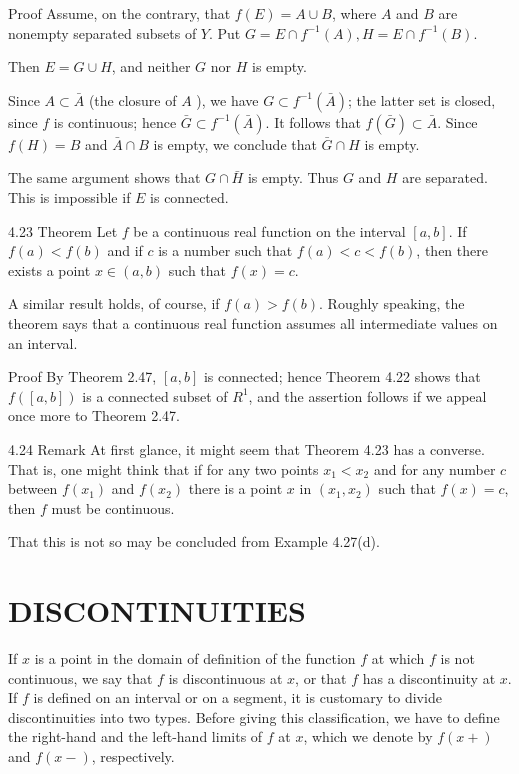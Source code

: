\documentclass[10pt]{article}
\begin{document}
Proof Assume, on the contrary, that $f(E)=A \cup B$, where $A$ and $B$ are nonempty separated subsets of $Y$. Put $G=E \cap f^{-1}(A), H=E \cap f^{-1}(B)$.

Then $E=G \cup H$, and neither $G$ nor $H$ is empty.

Since $A \subset \bar{A}$ (the closure of $A$ ), we have $G \subset f^{-1}(\bar{A})$; the latter set is closed, since $f$ is continuous; hence $\bar{G} \subset f^{-1}(\bar{A})$. It follows that $f(\bar{G}) \subset \bar{A}$. Since $f(H)=B$ and $\bar{A} \cap B$ is empty, we conclude that $\bar{G} \cap H$ is empty.

The same argument shows that $G \cap \bar{H}$ is empty. Thus $G$ and $H$ are separated. This is impossible if $E$ is connected.

4.23 Theorem Let $f$ be a continuous real function on the interval $[a, b]$. If $f(a)<f(b)$ and if $c$ is a number such that $f(a)<c<f(b)$, then there exists a point $x \in(a, b)$ such that $f(x)=c$.

A similar result holds, of course, if $f(a)>f(b)$. Roughly speaking, the theorem says that a continuous real function assumes all intermediate values on an interval.

Proof By Theorem 2.47, $[a, b]$ is connected; hence Theorem 4.22 shows that $f([a, b])$ is a connected subset of $R^{1}$, and the assertion follows if we appeal once more to Theorem 2.47.

4.24 Remark At first glance, it might seem that Theorem 4.23 has a converse. That is, one might think that if for any two points $x_{1}<x_{2}$ and for any number $c$ between $f\left(x_{1}\right)$ and $f\left(x_{2}\right)$ there is a point $x$ in $\left(x_{1}, x_{2}\right)$ such that $f(x)=c$, then $f$ must be continuous.

That this is not so may be concluded from Example 4.27(d).

\section{DISCONTINUITIES}
If $x$ is a point in the domain of definition of the function $f$ at which $f$ is not continuous, we say that $f$ is discontinuous at $x$, or that $f$ has a discontinuity at $x$. If $f$ is defined on an interval or on a segment, it is customary to divide discontinuities into two types. Before giving this classification, we have to define the right-hand and the left-hand limits of $f$ at $x$, which we denote by $f(x+)$ and $f(x-)$, respectively.
\end{document}
